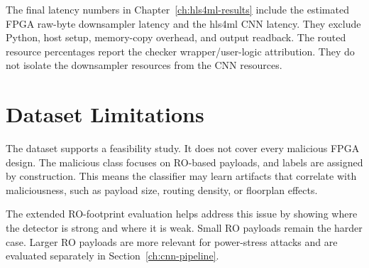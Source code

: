 The final latency numbers in Chapter~\ref{ch:hls4ml-results} include the estimated FPGA raw-byte downsampler latency and the hls4ml CNN latency. They exclude Python, host setup, memory-copy overhead, and output readback. The routed resource percentages report the checker wrapper/user-logic attribution. They do not isolate the downsampler resources from the CNN resources.

\section{Dataset Limitations}
\label{sec:dataset-limitations}

The dataset supports a feasibility study. It does not cover every malicious FPGA design. The malicious class focuses on RO-based payloads, and labels are assigned by construction. This means the classifier may learn artifacts that correlate with maliciousness, such as payload size, routing density, or floorplan effects.

The extended RO-footprint evaluation helps address this issue by showing where the detector is strong and where it is weak. Small RO payloads remain the harder case. Larger RO payloads are more relevant for power-stress attacks and are evaluated separately in Section~\ref{ch:cnn-pipeline}.
